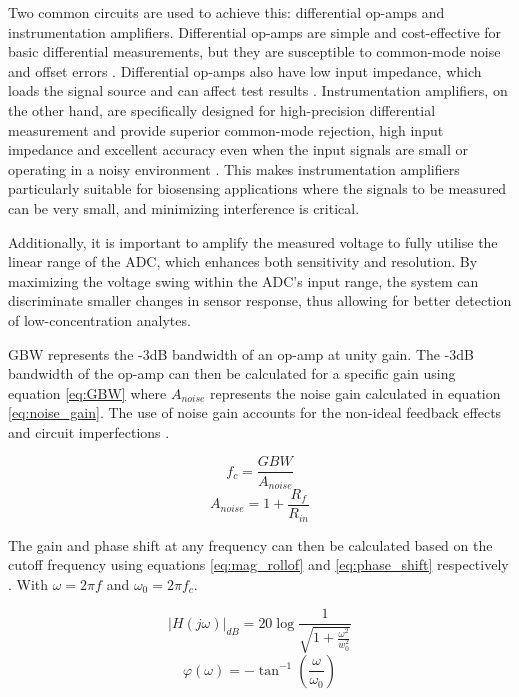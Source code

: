 Two common circuits are used to achieve this: differential op-amps and instrumentation amplifiers. Differential op-amps are simple and cost-effective for basic differential measurements, but they are susceptible to common-mode noise and offset errors \cite{technologyWhatAreDrawbacks2024}. Differential op-amps also have low input impedance, which loads the signal source and can affect test results \cite{technologyWhatAreDrawbacks2024}. Instrumentation amplifiers, on the other hand, are specifically designed for high-precision differential measurement and provide superior common-mode rejection, high input impedance and excellent accuracy even when the input signals are small or operating in a noisy environment \cite{InstrumentationAmplifierOperational}. This makes instrumentation amplifiers particularly suitable for biosensing applications where the signals to be measured can be very small, and minimizing interference is critical.

Additionally, it is important to amplify the measured voltage to fully utilise the linear range of the \ac{ADC}, which enhances both sensitivity and resolution. By maximizing the voltage swing within the \ac{ADC}'s input range, the system can discriminate smaller changes in sensor response, thus allowing for better detection of low-concentration analytes.

\Ac{GBW} represents the -3dB bandwidth of an op-amp at unity gain. The -3dB bandwidth of the op-amp can then be calculated for a specific gain using equation \ref{eq:GBW} where $A_{noise}$ represents the noise gain calculated in equation \ref{eq:noise_gain}. The use of noise gain accounts for the non-ideal feedback effects and circuit imperfections \cite{fiore53GainBandwidthProduct2018}.

\begin{equation}
    f_c = \frac{GBW}{A_{noise}}
    \label{eq:GBW}
\end{equation}
\begin{equation}
    A_{noise} = 1 + \frac{R_f}{R_{in}}
    \label{eq:noise_gain}
\end{equation}

The gain and phase shift at any frequency can then be calculated based on the cutoff frequency using equations \ref{eq:mag_rollof} and \ref{eq:phase_shift} respectively \cite{oljacaOperationalAmplifierGain2010}. With $\omega=2\pi f$ and $\omega_0=2\pi f_c$.

\begin{equation}
    |H(j\omega)|_{dB} = 20\log\frac{1}{\sqrt{1+\frac{\omega^2}{w_0^2}}}
    \label{eq:mag_rollof}
\end{equation}
\begin{equation}
    \varphi(\omega) = -\tan^{-1}(\frac{\omega}{\omega_0})
    \label{eq:phase_shift}
\end{equation}

